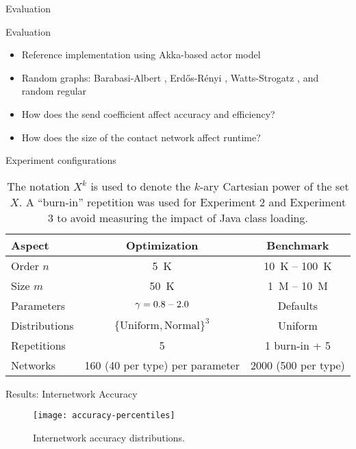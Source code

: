 \documentclass[11pt]{beamer}
\begin{document}
\begin{section}{Evaluation}

\begin{frame}{Evaluation}
\begin{itemize}
  \item Reference implementation using Akka-based actor model
  \item Random graphs: Barabasi-Albert \citep{Barabasi1999}, Erd\H{o}s-R\'{e}nyi \citep{Erdos1959}, Watts-Strogatz \citep{Watts1998}, and random regular \citep{Kim2003}
  \item How does the send coefficient affect accuracy and efficiency?
  \item How does the size of the contact network affect runtime?

\end{itemize}
\end{frame}

\begin{frame}{Experiment configurations}
\begin{table}
  \centering
  \small
  \renewcommand{\arraystretch}{2}
  \begin{tabular}{lcc}
    \toprule
    Aspect & Optimization & Benchmark \\
    \midrule
    Order $n$ & \qty{5}{K} & \qty{10}{K} -- \qty{100}{K} \\
    Size $m$ & \qty{50}{K} & \qty{1}{M} -- \qty{10}{M} \\
    Parameters & $\gamma = \text{0.8 -- 2.0}$ & Defaults \\
    Distributions & $\{\text{Uniform}, \text{Normal}\}^3$ & Uniform \\
    Repetitions & 5 & 1 burn-in + 5 \\
    Networks & 160 (40 per type) per parameter & \num{2000} (500 per type) \\
    \bottomrule
  \end{tabular}
  \caption[Experiment configurations]{The notation $X^k$ is used to denote the $k$-ary Cartesian power of the set $X$. A ``burn-in'' repetition was used for Experiment 2 and Experiment 3 to avoid measuring the impact of Java class loading.}
\end{table}
\end{frame}

\begin{frame}{Results: Internetwork Accuracy}
\begin{figure}
  \centering
  \texttt{[image: accuracy-percentiles]}
  \caption[Cumulative accuracy distributions]{Internetwork accuracy distributions.}
\end{figure}
\end{frame}


\end{section}
\end{document}
